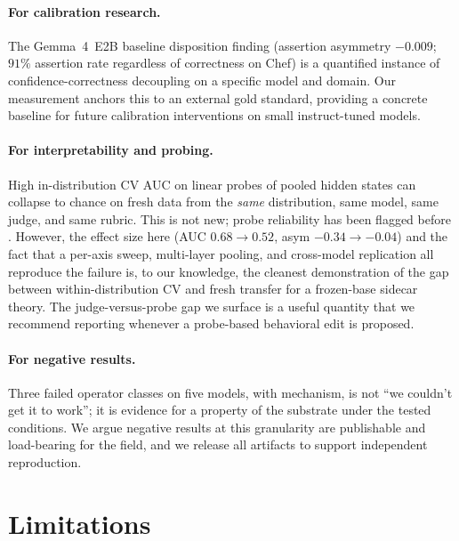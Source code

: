 \documentclass[11pt,a4paper]{article}
\begin{document}
\paragraph{For calibration research.} The Gemma~4~E2B baseline disposition finding (assertion asymmetry $-0.009$; $91\%$ assertion rate regardless of correctness on Chef) is a quantified instance of confidence-correctness decoupling on a specific model and domain. Our measurement anchors this to an external gold standard, providing a concrete baseline for future calibration interventions on small instruct-tuned models.

\paragraph{For interpretability and probing.} High in-distribution CV AUC on linear probes of pooled hidden states can collapse to chance on fresh data from the \emph{same} distribution, same model, same judge, and same rubric. This is not new; probe reliability has been flagged before \cite{hewitt2019designing, belinkov2022probing}. However, the effect size here (AUC $0.68 \to 0.52$, asym $-0.34 \to -0.04$) and the fact that a per-axis sweep, multi-layer pooling, and cross-model replication all reproduce the failure is, to our knowledge, the cleanest demonstration of the gap between within-distribution CV and fresh transfer for a frozen-base sidecar theory. The judge-versus-probe gap we surface is a useful quantity that we recommend reporting whenever a probe-based behavioral edit is proposed.

\paragraph{For negative results.} Three failed operator classes on five models, with mechanism, is not ``we couldn't get it to work''; it is evidence for a property of the substrate under the tested conditions. We argue negative results at this granularity are publishable and load-bearing for the field, and we release all artifacts to support independent reproduction.

\section{Limitations}
\end{document}
